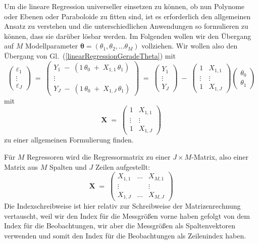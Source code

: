 Um die lineare Regression universeller einsetzen zu können, ob nun Polynome oder
Ebenen oder Paraboloide zu fitten sind, ist es erforderlich den allgemeinen Ansatz zu verstehen
und die unterschiedlichen Anwendungen so formulieren zu können, dass sie darüber lösbar werden. Im Folgenden wollen wir den Übergang auf $M$ Modellparameter
$\boldsymbol{\theta} = (\theta_1, \theta_2, \ldots \theta_M)$ vollziehen.
Wir wollen also den Übergang von Gl.~(\ref{linearRegressionGeradeTheta}) mit
\begin{equation*}
\left(
\begin{array}{c}
\varepsilon_1\\
\vdots \\
\varepsilon_J
\end{array}
\right)  \; = \;
\left(
\begin{array}{c}
 Y_{1} \; - \; (1 \, \theta_0 \; + \;  X_{1,1} \, \theta_1)\\
\vdots \\
 Y_{J} \; - \; (1 \, \theta_0 \; + \;  X_{1,J} \, \theta_1)
\end{array}
\right) \; = \;
\left(
\begin{array}{c}
 Y_{1}\\
\vdots \\
 Y_{J}
\end{array}
\right)
\; - \;
\left(
\begin{array}{cc}
 1 &  X_{1,1} \\
\vdots & \vdots\\
 1 & X_{1,J}
\end{array}
\right)
\left(
\begin{array}{c}
\theta_0\\
\theta_1
\end{array}
\right)
\end{equation*}
mit
\begin{equation*}
\mathbf{X} \; = \;
\left(
\begin{array}{cc}
 1 &  X_{1,1} \\
\vdots & \vdots\\
 1 & X_{1,J}
\end{array}
\right)
\end{equation*}
zu einer allgemeinen Formulierung finden.

Für $M$ Regressoren wird die Regressormatrix zu einer $J \times M$-Matrix, also einer Matrix
aus $M$ Spalten und $J$ Zeilen aufgestellt:
\begin{equation}
\mathbf{X} \; = \;
\left(
\begin{array}{ccc}
 X_{1,1} & \dots &  X_{M,1} \\
\vdots & & \vdots \\
 X_{1,J}  & \dots &  X_{M,J}
\end{array}
\right)
\end{equation}
Die Indexschreibweise ist hier relativ zur Schreibweise der Matrizenrechnung vertauscht, weil wir den Index für die
Messgrößen vorne haben gefolgt von dem Index für die Beobachtungen, wir aber die Messgrößen als
Spaltenvektoren verwenden und somit den Index für die Beobachtungen als Zeilenindex haben.

